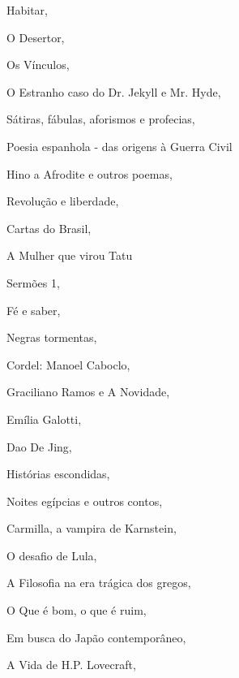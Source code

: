 \begin{multicols}{2}
\begin{enumerate}
{\item Habitar, {}
\item O Desertor, {}
\item Os Vínculos, {}
\item O Estranho caso do Dr. Jekyll e Mr. Hyde, {}
\item Sátiras, fábulas, aforismos e profecias, {}
\item Poesia espanhola - das origens à Guerra Civil
\item Hino a Afrodite e outros poemas, {}
\item Revolução e liberdade, {}
\item Cartas do Brasil, {}
\item A Mulher que virou Tatu
\item Sermões 1, {}
\item Fé e saber, {}
\item Negras tormentas, {}
\item Cordel: Manoel Caboclo, {}
\item Graciliano Ramos e A Novidade, {}
\item Emília Galotti, {}
\item Dao De Jing, {}
\item Histórias escondidas, {}
\item Noites egípcias e outros contos, {}
\item Carmilla, a vampira de Karnstein, {}
\item O desafio de Lula, {}
\item A Filosofia na era trágica dos gregos, {}
\item O Que é bom, o que é ruim, {}
\item Em busca do Japão contemporâneo, {}
\item A Vida de H.P. Lovecraft, {}
}
\end{enumerate}
\end{multicols}
